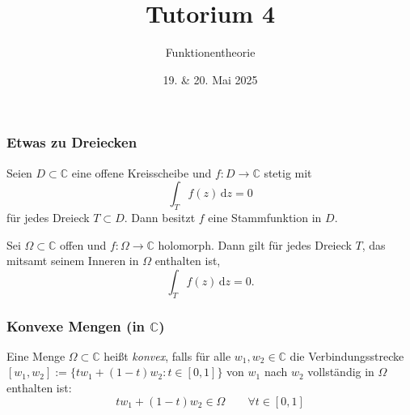 \documentclass[10pt]{beamer}
\author[\url{https://fdf-uni.github.io/ft}]{}
\title{Tutorium 4}
\subtitle{\texorpdfstring{Funktionentheorie\vspace*{-1.5cm}}{Funktionentheorie}}
\date{19. \& 20. Mai 2025}
\begin{document}
\begin{frame}
	\titlepage
\end{frame}
\begin{frame}
	\frametitle{Etwas zu Dreiecken}
	\pause
	\begin{theorem}
		Seien $D \subset \mathbb{C}$ eine offene Kreisscheibe und $f \colon D \to \mathbb{C}$ stetig mit
		\[
			\int_T f(z) \,\mathrm{d}z = 0
		\]
		für jedes Dreieck $T \subset D$.
		Dann besitzt $f$ eine Stammfunktion in $D$.
	\end{theorem}
	\pause
	\begin{lemma}
		Sei $\Omega \subset \mathbb{C}$ offen und $f \colon \Omega \to \mathbb{C}$ holomorph.
		Dann gilt für jedes Dreieck $T$, das mitsamt seinem \glqq Inneren\grqq{} in $\Omega$ enthalten ist,
		\[
			\int_T f(z) \,\mathrm{d}z = 0.
		\]
	\end{lemma}
\end{frame}
\begin{frame}
	\frametitle{Konvexe Mengen (in $\mathbb{C}$)}
	\pause
	\begin{definition}
		Eine Menge $\Omega \subset \mathbb{C}$ heißt \emph{konvex}, falls für alle $w_1, w_2 \in \mathbb{C}$ die Verbindungsstrecke $[w_1, w_2] := \{t w_1 + (1 - t) w_2 : t \in [0, 1]\}$ von $w_1$ nach $w_2$ vollständig in $\Omega$ enthalten ist:
		\[
			t w_1 + (1 - t) w_2 \in \Omega \qquad \forall t \in [0, 1]
		\]
	\end{definition}
	\pause
	\begin{center}
	\end{center}
\end{frame}
\end{document}
